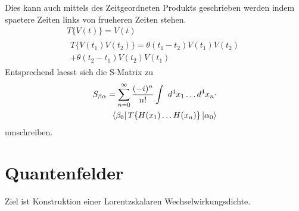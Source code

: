 \documentclass[11pt,a4paper,twocolumn]{article}
\begin{document}
Dies kann auch mittels des Zeitgeordneten Produkts geschrieben werden indem 
spaetere Zeiten links von frueheren Zeiten stehen.
\begin{eqnarray}
		T\{V(t)\} = V(t) \\
		\begin{split}
				T\{V(t_1)V(t_2)\} = \theta(t_1 -t_2)V(t_1)V(t_2) \\ + \theta(t_2 -t_1)V(t_2)V(t_1)
		\end{split}
\end{eqnarray}
Entsprechend laesst sich die S-Matrix zu 
\begin{equation}
		\begin{split}
				S_{\beta \alpha} = \sum^{\infty}_{n=0} \frac{(-i)^n}{n!} \int \ d^4x_1
				\dots d^4x_n \cdot \\ \bra{\beta_0} T\{H(x_1) \dots H(x_n)\} \ket{\alpha_0}
		\end{split}
\end{equation}
umschreiben.

\section{Quantenfelder}
Ziel ist Konstruktion einer Lorentzskalaren Wechselwirkungsdichte.
\end{document}

